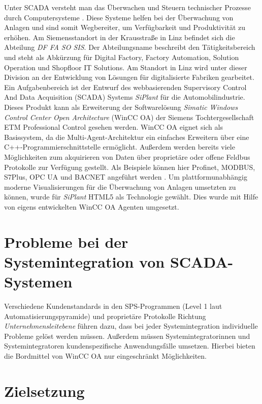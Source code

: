 Unter SCADA versteht man das Überwachen und Steuern technischer Prozesse durch Computersysteme \cite{whatIsScada}.
Diese Systeme helfen bei der Überwachung von Anlagen und sind somit Wegbereiter, um Verfügbarkeit und Produktivität zu erhöhen. 
Am Siemensstandort in der Krausstraße in Linz befindet sich die Abteilung \textit{DF FA SO SIS}. Der
Abteilungsname beschreibt den Tätigkeitsbereich und steht als Abkürzung für Digital
Factory, Factory Automation, Solution Operation und Shopfloor IT Solutions. 
Am Standort in Linz wird unter dieser Division an der Entwicklung von Lösungen für digitalisierte Fabriken gearbeitet. 
Ein Aufgabenbereich ist der Entwurf des webbasierenden Supervisory Control And Data Acquisition (SCADA) Systems 
\textit{SiPlant} für die Automobilindustrie. Dieses Produkt kann als Erweiterung der Softwarelösung
\textit{Simatic Windows Control Center Open Architecture} (WinCC OA) der Siemens Tochtergesellschaft ETM Professional Control 
gesehen werden. WinCC OA eignet sich als Basissystem, da die Multi-Agent-Architektur ein einfaches Erweitern über eine 
C++-Programmierschnittstelle ermöglicht. Außerdem werden bereits viele Möglichkeiten zum akquirieren von Daten über proprietäre oder offene 
Feldbus Protokolle zur Verfügung gestellt. Als Beispiele können hier Profinet, MODBUS, S7Plus, OPC UA und BACNET angeführt werden \cite{WinCCOA}.
Um plattformunabhängig moderne Visualisierungen für die Überwachung von Anlagen umsetzten zu können, 
wurde für \textit{SiPlant} HTML5 als Technologie gewählt. Dies wurde mit Hilfe von eigens entwickelten WinCC OA Agenten umgesetzt.

\section{Probleme bei der Systemintegration von SCADA-Systemen}

Verschiedene Kundenstandards in den SPS-Programmen (Level 1 laut Automatisierungspyramide) und proprietäre Protokolle 
Richtung \textit{Unternehmensleitebene} führen dazu, dass bei jeder Systemintegration individuelle Probleme gelöst werden müssen.
Außerdem müssen Systemintegratorinnen und Systemintegratoren kundenspezifische Anwendungsfälle umsetzen. Hierbei bieten die
Bordmittel von WinCC OA nur eingeschränkt Möglichkeiten.

\section{Zielsetzung}


